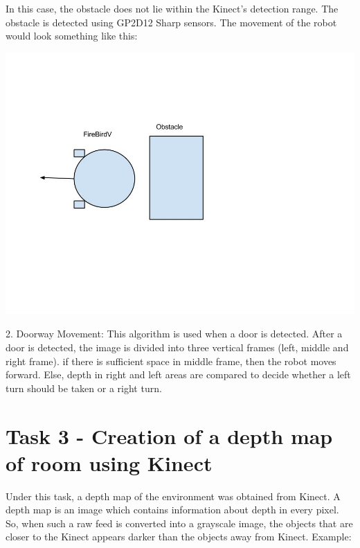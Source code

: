 \documentclass{report}
\begin{document}
In this case, the obstacle does not lie within the Kinect's detection range. 
The obstacle is detected using GP2D12 Sharp sensors. The movement of the robot would look something like this:
\begin{flushleft}
 

\includegraphics[width = 20CM]{Case_2.jpg}

\end{flushleft}

2. Doorway Movement:
This algorithm is used when a door is detected. After a door is detected, 
the image is divided into three vertical frames (left, middle and right frame). 
if there is sufficient space in middle frame, then the robot moves forward. Else, 
depth in right and left areas are compared to decide whether a left turn should be taken or a right turn.

\section{Task 3 - Creation of a depth map of room using Kinect}
Under this task, a depth map of the environment was obtained from Kinect. A depth map is an image which contains information about
depth in every pixel. So, when such a raw feed is converted into a grayscale image, the objects that are closer to the Kinect appears darker
than the objects away from Kinect. Example: \\
\end{document}
